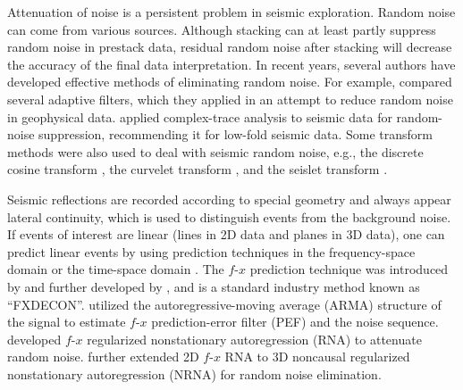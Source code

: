Attenuation of noise is a persistent problem in seismic
exploration. Random noise can come from various sources. Although
stacking can at least partly suppress random noise in prestack data,
residual random noise after stacking will decrease the accuracy of
the final data interpretation. In recent years, several authors have
developed effective methods of eliminating random noise. For example,
\cite{Ristau01} compared several adaptive filters, which they applied
in an attempt to reduce random noise in geophysical
data. \cite{Karsli06} applied complex-trace analysis to seismic data
for random-noise suppression, recommending it for low-fold seismic
data. Some transform methods were also used to deal with seismic
random noise, e.g., the discrete cosine transform \cite[]{Lu07}, the
curvelet transform \cite[]{Neelamani08}, and the seislet transform
\cite[]{Fomel10}. 

Seismic reflections are recorded according to special geometry and
always appear lateral continuity, which is used to distinguish events
from the background noise. If events of interest are linear (lines in
2D data and planes in 3D data), one can predict linear events by using
prediction techniques in the frequency-space domain or
the time-space domain \cite[]{Abma95}. The $f$-$x$ prediction
technique was introduced by \cite{Canales84} and further developed by
\cite{Gulunay86}, and is a standard industry 
method known as ``FXDECON''.
\cite{Sacchi01} utilized the autoregressive-moving average
(ARMA) structure of the signal to estimate $f$-$x$ prediction-error
filter (PEF) and the noise sequence. \cite{Liu12} developed $f$-$x$
regularized nonstationary autoregression (RNA) to attenuate random
noise. \cite{Liu13} further extended 2D $f$-$x$ RNA to 3D noncausal
regularized nonstationary autoregression (NRNA) for random noise
elimination.

